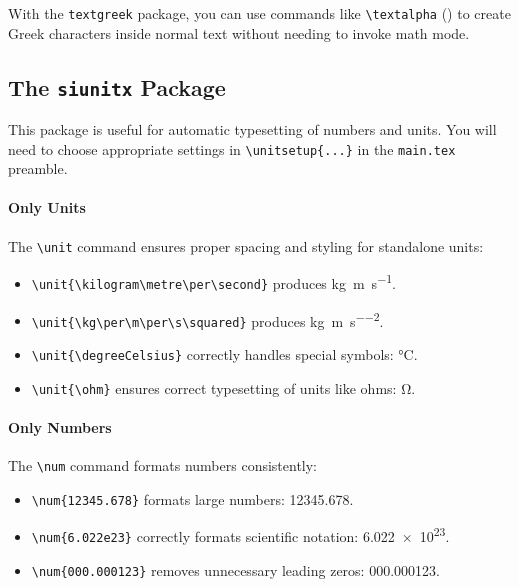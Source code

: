    With the \verb|textgreek| package, you can use commands like \verb|\textalpha| (\textalpha) to create Greek characters inside normal text without needing to invoke math mode.

\subsection{The \texttt{siunitx} Package}

    This package is useful for automatic typesetting of numbers and units. You will need to choose appropriate settings in \verb|\unitsetup{...}| in the \verb|main.tex| preamble. %

    \paragraph*{Only Units}
        The \verb|\unit| command ensures proper spacing and styling for standalone units:
        \begin{itemize}
            \item \verb|\unit{\kilogram\metre\per\second}| produces \unit{\kilogram\metre\per\second}.
            \item \verb|\unit{\kg\per\m\per\s\squared}| produces \unit{\kg\per\m\per\s\squared}.
            \item \verb|\unit{\degreeCelsius}| correctly handles special symbols: \unit{\degreeCelsius}.
            \item \verb|\unit{\ohm}| ensures correct typesetting of units like ohms: \unit{\ohm}.
        \end{itemize}

    \paragraph*{Only Numbers}
        The \verb|\num| command formats numbers consistently:
        \begin{itemize}
            \item \verb|\num{12345.678}| formats large numbers: \num{12345.678}.
            \item \verb|\num{6.022e23}| correctly formats scientific notation: \num{6.022e23}.
            \item \verb|\num{000.000123}| removes unnecessary leading zeros: \num{000.000123}.
        \end{itemize}

